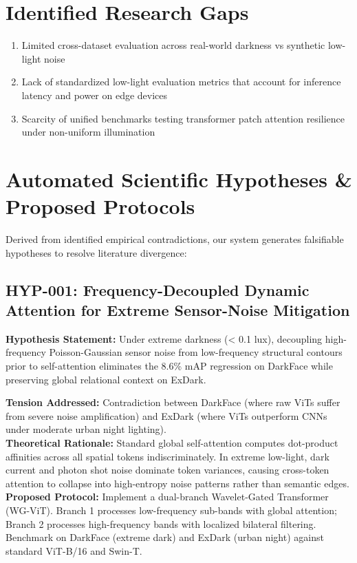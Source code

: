 \documentclass[11pt,a4paper]{article}
\begin{document}
\section{Identified Research Gaps}
\begin{enumerate}
    \item Limited cross-dataset evaluation across real-world darkness vs synthetic low-light noise
    \item Lack of standardized low-light evaluation metrics that account for inference latency and power on edge devices
    \item Scarcity of unified benchmarks testing transformer patch attention resilience under non-uniform illumination
\end{enumerate}

\section{Automated Scientific Hypotheses \& Proposed Protocols}
Derived from identified empirical contradictions, our system generates falsifiable hypotheses to resolve literature divergence:

\subsection*{HYP-001: Frequency-Decoupled Dynamic Attention for Extreme Sensor-Noise Mitigation}
\noindent\textbf{Hypothesis Statement:} Under extreme darkness (< 0.1 lux), decoupling high-frequency Poisson-Gaussian sensor noise from low-frequency structural contours prior to self-attention eliminates the 8.6\% mAP regression on DarkFace while preserving global relational context on ExDark.

\noindent\textbf{Tension Addressed:} Contradiction between DarkFace (where raw ViTs suffer from severe noise amplification) and ExDark (where ViTs outperform CNNs under moderate urban night lighting). \\
\noindent\textbf{Theoretical Rationale:} Standard global self-attention computes dot-product affinities across all spatial tokens indiscriminately. In extreme low-light, dark current and photon shot noise dominate token variances, causing cross-token attention to collapse into high-entropy noise patterns rather than semantic edges. \\
\noindent\textbf{Proposed Protocol:} Implement a dual-branch Wavelet-Gated Transformer (WG-ViT). Branch 1 processes low-frequency sub-bands with global attention; Branch 2 processes high-frequency bands with localized bilateral filtering. Benchmark on DarkFace (extreme dark) and ExDark (urban night) against standard ViT-B/16 and Swin-T.
\end{document}
